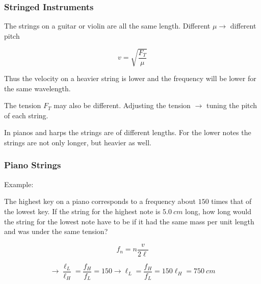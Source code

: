 \documentclass[]{beamer}
\begin{document}



\begin{frame}
\frametitle{Stringed Instruments}


The strings on a guitar or violin are all the same length. Different $\mu\rightarrow$ different pitch

\pause


\begin{equation}
v=\sqrt{\frac{F_T}{\mu}}
\end{equation}

\vspace{3mm}
\pause

Thus the velocity on a heavier string is lower and the frequency will be lower for the
same wavelength.


\vspace{3mm}
\pause

The tension $F_T$ may also be different.  Adjusting the tension $\rightarrow$ tuning the pitch of each string.

\vspace{3mm}
\pause
  In pianos and harps the strings are of different lengths. For the lower notes the strings are not only longer, but heavier as well.

  \end{frame}









\begin{frame}
\frametitle{Piano Strings}

Example:

\vspace{3mm}

The highest key on a piano corresponds to a frequency about $150$ times that of the lowest key. If the string for the highest note
is $5.0~cm$ long, how long would the string for the lowest note have to be if it had the same mass per unit length and was under the same tension?

\pause

\begin{equation}
f_n=n\frac{v}{2\ell}
\end{equation}
\pause


\begin{equation}
\rightarrow \frac{\ell_L}{\ell_H}=\frac{f_H}{f_L}=150\rightarrow\ell_L=\frac{f_H}{f_L}=150\ell_H=750~cm
\end{equation}


  \end{frame}
\end{document}

